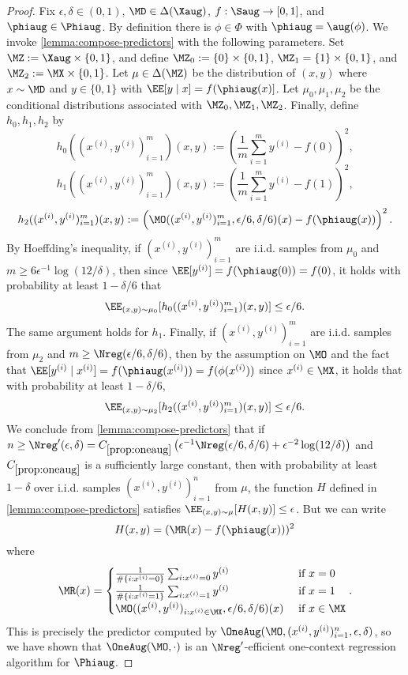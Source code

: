 \begin{proof}
Fix $\epsilon,\delta \in (0,1)$, $\MD \in \Delta(\Xaug)$, $f: \Saug \to [0,1]$, and $\phiaug\in\Phiaug$. By definition there is $\phi\in\Phi$ with $\phiaug = \aug(\phi)$. We invoke \cref{lemma:compose-predictors} with the following parameters. Set $\MZ := \Xaug \times \{0,1\}$, and define $\MZ_0 := \{0\} \times \{0,1\}$, $\MZ_1 = \{1\}\times\{0,1\}$, and $\MZ_2 := \MX \times \{0,1\}$. Let $\mu \in \Delta(\MZ)$ be the distribution of $(x,y)$ where $x \sim \MD$ and $y \in \{0,1\}$ with $\EE[y\mid{}x] = f(\phiaug(x)]$. Let $\mu_0,\mu_1,\mu_2$ be the conditional distributions associated with $\MZ_0,\MZ_1,\MZ_2$. Finally, define $h_0,h_1,h_2$ by \[h_0((x^{(i)},y^{(i)})_{i=1}^m)(x,y) := \left(\frac{1}{m}\sum_{i=1}^m y^{(i)} -f(0)\right)^2,\]
\[h_1((x^{(i)},y^{(i)})_{i=1}^m)(x,y) := \left(\frac{1}{m}\sum_{i=1}^m y^{(i)} -f(1)\right)^2,\]
\[h_2((x^{(i)},y^{(i)})_{i=1}^m)(x,y) := \left(\MO((x^{(i)},y^{(i)})_{i=1}^m,\epsilon/6,\delta/6)(x) - f(\phiaug(x))\right)^2.\]
By Hoeffding's inequality, if $(x^{(i)},y^{(i)})_{i=1}^m$ are i.i.d. samples from $\mu_0$ and $m \geq 6\epsilon^{-1}\log(12/\delta)$, then since $\EE[y^{(i)}] = f(\phiaug(0)) = f(0)$, it holds with probability at least $1-\delta/6$ that \[\EE_{(x,y)\sim\mu_0}[h_0((x^{(i)},y^{(i)})_{i=1}^m)(x,y)] \leq \epsilon/6.\]
The same argument holds for $h_1$. Finally, if $(x^{(i)},y^{(i)})_{i=1}^m$ are i.i.d. samples from $\mu_2$ and $m \geq \Nreg(\epsilon/6,\delta/6)$, then by the assumption on $\MO$ and the fact that $\EE[y^{(i)}\mid{}x^{(i)}] = f(\phiaug(x^{(i)})) = f(\phi(x^{(i)}))$ since $x^{(i)} \in\MX$, it holds that with probability at least $1-\delta/6$,
\[\EE_{(x,y)\sim\mu_2}[h_2((x^{(i)},y^{(i)})_{i=1}^m)(x,y)] \leq \epsilon/6.\]
We conclude from \cref{lemma:compose-predictors} that if $n \geq \Nreg'(\epsilon,\delta) = C_{\ref{prop:oneaug}}\left(\epsilon^{-1}\Nreg(\epsilon/6,\delta/6) + \epsilon^{-2}\log(12/\delta)\right)$ and $C_{\ref{prop:oneaug}}$ is a sufficiently large constant, then with probability at least $1-\delta$ over i.i.d. samples $(x^{(i)},y^{(i)})_{i=1}^n$ from $\mu$, the function $H$ defined in \cref{lemma:compose-predictors} satisfies $\EE_{(x,y)\sim\mu}[H(x,y)] \leq \epsilon$. But we can write
\[H(x,y) = (\MR(x) - f(\phiaug(x)))^2\]
where
\[\MR(x) = \begin{cases} 
\frac{1}{\#\{i: x^{(i)}=0\}}\sum_{i:x^{(i)}=0} y^{(i)} & \text{ if } x = 0 \\ 
\frac{1}{\#\{i: x^{(i)}=1\}}\sum_{i:x^{(i)}=1} y^{(i)} & \text{ if } x = 1 \\
\MO((x^{(i)},y^{(i)})_{i: x^{(i)}\in\MX},\epsilon/6,\delta/6)(x) & \text{ if } x \in \MX
\end{cases}.\]
This is precisely the predictor computed by $\OneAug(\MO,(x^{(i)},y^{(i)})_{i=1}^n,\epsilon,\delta)$, so we have shown that $\OneAug(\MO,\cdot)$ is an $\Nreg'$-efficient one-context regression algorithm for $\Phiaug$. 
\end{proof}

